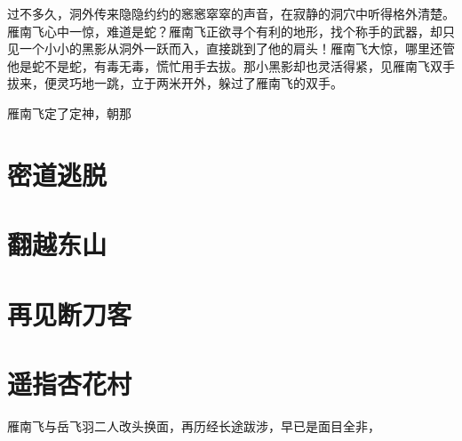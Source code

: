 过不多久，洞外传来隐隐约约的窸窸窣窣的声音，在寂静的洞穴中听得格外清楚。雁南飞心中一惊，难道是蛇？雁南飞正欲寻个有利的地形，找个称手的武器，却只见一个小小的黑影从洞外一跃而入，直接跳到了他的肩头！雁南飞大惊，哪里还管他是蛇不是蛇，有毒无毒，慌忙用手去拔。那小黑影却也灵活得紧，见雁南飞双手拔来，便灵巧地一跳，立于两米开外，躲过了雁南飞的双手。

雁南飞定了定神，朝那




\section{密道逃脱}


\section{翻越东山}
\section{再见断刀客}
\section{遥指杏花村}

雁南飞与岳飞羽二人改头换面，再历经长途跋涉，早已是面目全非，


